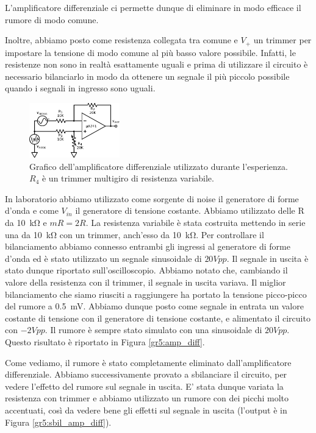 L'amplificatore differenziale ci permette dunque di eliminare in modo efficace il rumore di modo comune. 

Inoltre, abbiamo posto come resistenza collegata tra comune e $V_+$ un trimmer per impostare la tensione di modo comune al più basso valore possibile. Infatti, le resistenze non sono in realtà esattamente uguali e prima di utilizzare il circuito è necessario bilanciarlo in modo da ottenere un segnale il più piccolo possibile quando i segnali in ingresso sono uguali.

\begin{figure}
  \begin{center}
    \includegraphics[width=0.35\textwidth]{../E05/latex/c_diff_amp.pdf}
  \end{center}
  \caption{Grafico dell'amplificatore differenziale utilizzato durante l'esperienza. $R_4$ è un trimmer multigiro di resistenza variabile.}
  \label{cir5:diff_amp}
\end{figure}

In laboratorio abbiamo utilizzato come sorgente di noise il generatore di forme d'onda e come $V_{in}$ il generatore di tensione costante. Abbiamo utilizzato delle R da \SI{10}{\kilo\ohm} e $mR=2R$. La resistenza variabile è stata costruita mettendo in serie una da \SI{10}{\kilo\ohm} con un trimmer, anch'esso da \SI{10}{\kilo\ohm}. Per controllare il bilanciamento abbiamo connesso entrambi gli ingressi al generatore di forme d'onda ed è stato utilizzato un segnale sinusoidale di $20Vpp$. Il segnale in uscita è stato dunque riportato sull'oscilloscopio. Abbiamo notato che, cambiando il valore della resistenza con il trimmer, il segnale in uscita variava. Il miglior bilanciamento che siamo riusciti a raggiungere ha portato la tensione picco-picco del rumore a \SI{0.5}{\milli\volt}. Abbiamo dunque posto come segnale in entrata un valore costante di tensione con il generatore di tensione costante, e alimentato il circuito con $-2Vpp$. Il rumore è sempre stato simulato con una sinusoidale di $20Vpp$. Questo risultato è riportato in Figura \ref{gr5:amp_diff}.

Come vediamo, il rumore è stato completamente eliminato dall'amplificatore differenziale. Abbiamo successivamente provato a sbilanciare il circuito, per vedere l'effetto del rumore sul segnale in uscita. E' stata dunque variata la resistenza con trimmer e abbiamo utilizzato un rumore con dei picchi molto accentuati, così da vedere bene gli effetti sul segnale in uscita (l'output è in Figura \ref{gr5:sbil_amp_diff}). 

